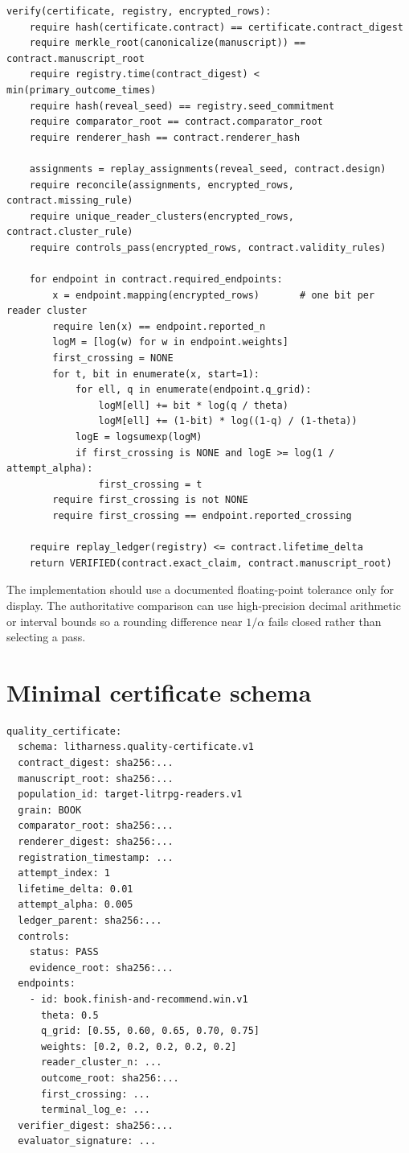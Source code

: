 \documentclass[11pt]{article}
\theoremstyle{remark}
\begin{document}
\small
\begin{verbatim}
verify(certificate, registry, encrypted_rows):
    require hash(certificate.contract) == certificate.contract_digest
    require merkle_root(canonicalize(manuscript)) == contract.manuscript_root
    require registry.time(contract_digest) < min(primary_outcome_times)
    require hash(reveal_seed) == registry.seed_commitment
    require comparator_root == contract.comparator_root
    require renderer_hash == contract.renderer_hash

    assignments = replay_assignments(reveal_seed, contract.design)
    require reconcile(assignments, encrypted_rows, contract.missing_rule)
    require unique_reader_clusters(encrypted_rows, contract.cluster_rule)
    require controls_pass(encrypted_rows, contract.validity_rules)

    for endpoint in contract.required_endpoints:
        x = endpoint.mapping(encrypted_rows)       # one bit per reader cluster
        require len(x) == endpoint.reported_n
        logM = [log(w) for w in endpoint.weights]
        first_crossing = NONE
        for t, bit in enumerate(x, start=1):
            for ell, q in enumerate(endpoint.q_grid):
                logM[ell] += bit * log(q / theta)
                logM[ell] += (1-bit) * log((1-q) / (1-theta))
            logE = logsumexp(logM)
            if first_crossing is NONE and logE >= log(1 / attempt_alpha):
                first_crossing = t
        require first_crossing is not NONE
        require first_crossing == endpoint.reported_crossing

    require replay_ledger(registry) <= contract.lifetime_delta
    return VERIFIED(contract.exact_claim, contract.manuscript_root)
\end{verbatim}
\normalsize

The implementation should use a documented floating-point tolerance only for display. The
authoritative comparison can use high-precision decimal arithmetic or interval bounds so a
rounding difference near $1/\alpha$ fails closed rather than selecting a pass.

\section{Minimal certificate schema}

\small
\begin{verbatim}
quality_certificate:
  schema: litharness.quality-certificate.v1
  contract_digest: sha256:...
  manuscript_root: sha256:...
  population_id: target-litrpg-readers.v1
  grain: BOOK
  comparator_root: sha256:...
  renderer_digest: sha256:...
  registration_timestamp: ...
  attempt_index: 1
  lifetime_delta: 0.01
  attempt_alpha: 0.005
  ledger_parent: sha256:...
  controls:
    status: PASS
    evidence_root: sha256:...
  endpoints:
    - id: book.finish-and-recommend.win.v1
      theta: 0.5
      q_grid: [0.55, 0.60, 0.65, 0.70, 0.75]
      weights: [0.2, 0.2, 0.2, 0.2, 0.2]
      reader_cluster_n: ...
      outcome_root: sha256:...
      first_crossing: ...
      terminal_log_e: ...
  verifier_digest: sha256:...
  evaluator_signature: ...
\end{verbatim}
\normalsize
\end{document}
